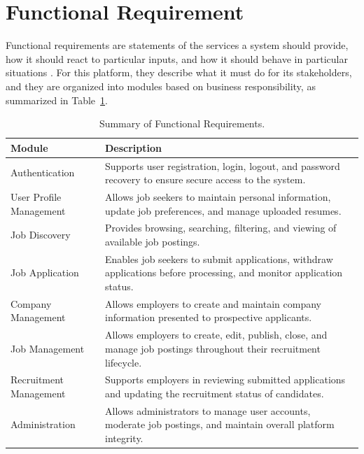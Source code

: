 \section{Functional Requirement}

Functional requirements are statements of the services a system should provide, how it should react to particular inputs, and how it should behave in particular situations \cite{sommerville2016software}. For this platform, they describe what it must do for its stakeholders, and they are organized into modules based on business responsibility, as summarized in Table~\ref{tab:functional-requirements}.

\begin{table}[H]
	\centering
	\caption{Summary of Functional Requirements.}
	\label{tab:functional-requirements}
	\begin{tabular}{|p{4cm}|p{10cm}|}
		\hline
		\textbf{Module} & \textbf{Description} \\
		\hline
		
		Authentication &
		Supports user registration, login, logout, and password recovery to ensure secure access to the system. \\
		\hline
		
		User Profile Management &
		Allows job seekers to maintain personal information, update job preferences, and manage uploaded resumes. \\
		\hline
		
		Job Discovery &
		Provides browsing, searching, filtering, and viewing of available job postings. \\
		\hline
		
		Job Application &
		Enables job seekers to submit applications, withdraw applications before processing, and monitor application status. \\
		\hline
		
		Company Management &
		Allows employers to create and maintain company information presented to prospective applicants. \\
		\hline
		
		Job Management &
		Allows employers to create, edit, publish, close, and manage job postings throughout their recruitment lifecycle. \\
		\hline
		
		Recruitment Management &
		Supports employers in reviewing submitted applications and updating the recruitment status of candidates. \\
		\hline
		
		Administration &
		Allows administrators to manage user accounts, moderate job postings, and maintain overall platform integrity. \\
		\hline
		
	\end{tabular}
\end{table}


